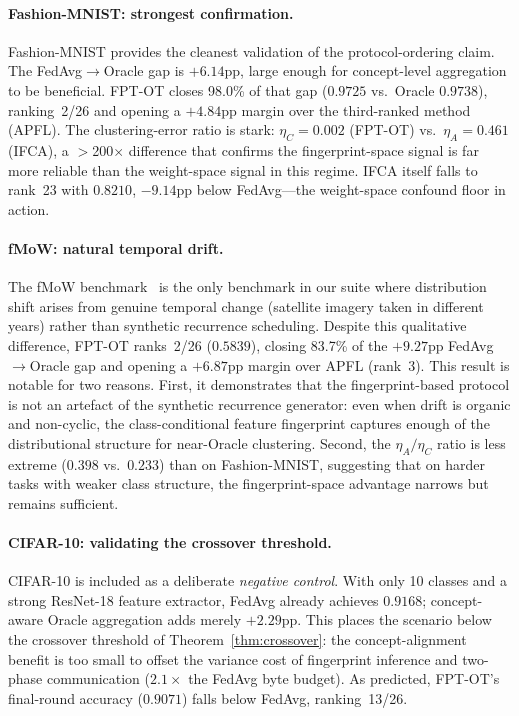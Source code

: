 \paragraph{Fashion-MNIST: strongest confirmation.}
Fashion-MNIST provides the cleanest validation of the protocol-ordering claim.
The FedAvg$\to$Oracle gap is $+6.14$pp, large enough for concept-level aggregation to be beneficial.
FPT-OT closes 98.0\% of that gap ($0.9725$ vs.\ Oracle $0.9738$), ranking~2/26 and opening a $+4.84$pp margin over the third-ranked method (APFL).
The clustering-error ratio is stark: $\eta_C = 0.002$ (FPT-OT) vs.\ $\eta_A = 0.461$ (IFCA), a $>$200$\times$ difference that confirms the fingerprint-space signal is far more reliable than the weight-space signal in this regime.
IFCA itself falls to rank~23 with $0.8210$, $-9.14$pp below FedAvg---the weight-space confound floor in action.

\paragraph{fMoW: natural temporal drift.}
The fMoW benchmark~\citep{koh2021wilds} is the only benchmark in our suite where distribution shift arises from genuine temporal change (satellite imagery taken in different years) rather than synthetic recurrence scheduling.
Despite this qualitative difference, FPT-OT ranks~2/26 ($0.5839$), closing 83.7\% of the $+9.27$pp FedAvg$\to$Oracle gap and opening a $+6.87$pp margin over APFL (rank~3).
This result is notable for two reasons.
First, it demonstrates that the fingerprint-based protocol is not an artefact of the synthetic recurrence generator: even when drift is organic and non-cyclic, the class-conditional feature fingerprint captures enough of the distributional structure for near-Oracle clustering.
Second, the $\eta_A / \eta_C$ ratio is less extreme ($0.398$ vs.\ $0.233$) than on Fashion-MNIST, suggesting that on harder tasks with weaker class structure, the fingerprint-space advantage narrows but remains sufficient.

\paragraph{CIFAR-10: validating the crossover threshold.}
\label{par:cifar10_analysis}
CIFAR-10 is included as a deliberate \emph{negative control}.
With only 10 classes and a strong ResNet-18 feature extractor, FedAvg already achieves $0.9168$; concept-aware Oracle aggregation adds merely $+2.29$pp.
This places the scenario below the crossover threshold of Theorem~\ref{thm:crossover}: the concept-alignment benefit is too small to offset the variance cost of fingerprint inference and two-phase communication ($2.1\times$ the FedAvg byte budget).
As predicted, FPT-OT's final-round accuracy ($0.9071$) falls below FedAvg, ranking~13/26.


